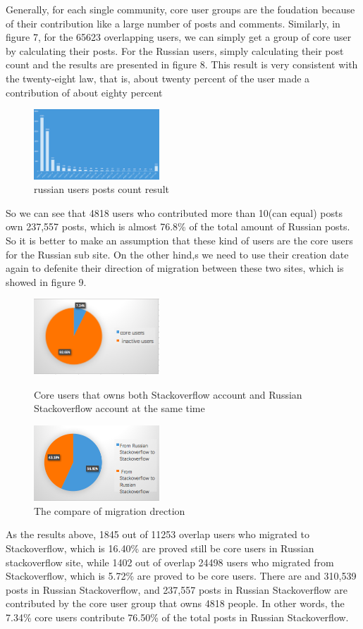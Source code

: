 \documentclass[A4paper,twoside,twocolumn]{article}
\begin{document}
Generally, for each single community, core user groups are the foudation because of their contribution like a large number of posts and comments. Similarly, in figure 7, for the 65623 overlapping users, we can simply get a group of core user by calculating their posts. For the Russian users, simply calculating their post count and the results are presented in figure 8. This result is very consistent with the twenty-eight law, that is, about twenty percent of the user made a contribution of about eighty percent
	\begin{figure}[H]
		\includegraphics[width = 0.42\textwidth]{coreuser.png}
		\caption{russian users posts count result}
  	\end{figure}
So we can see that 4818 users who contributed more than 10(can equal) posts own 237,557 posts, which is almost 76.8\% of the total amount of Russian posts. So it is better to make an assumption that these kind of users are the core users for the Russian sub site. On the other hind,s we need to use their creation date again to defenite their direction of migration between these two sites, which is showed in figure 9.
 \begin{figure}[H]
		\includegraphics[width = 0.42\textwidth]{coreuser1.png}
		\caption{Core users that owns both Stackoverflow account and Russian Stackoverflow account at the same time}
		\includegraphics[width = 0.42\textwidth]{coreuser2.png}
		\caption{The compare of migration drection }
  	\end{figure}
As the results above, 1845 out of 11253 overlap users who migrated to Stackoverflow, which is 16.40\% are proved still be core users in Russian stackoverflow site, while 1402 out of overlap 24498 users who migrated from Stackoverflow, which is 5.72\% are proved to be core users.
There are and 310,539 posts in Russian Stackoverflow, and 237,557 posts in Russian Stackoverflow are contributed by the core user group that owns 4818 people. In other words, the 7.34\% core users contribute 76.50\% of the total posts in Russian Stackoverflow.
\end{document}
